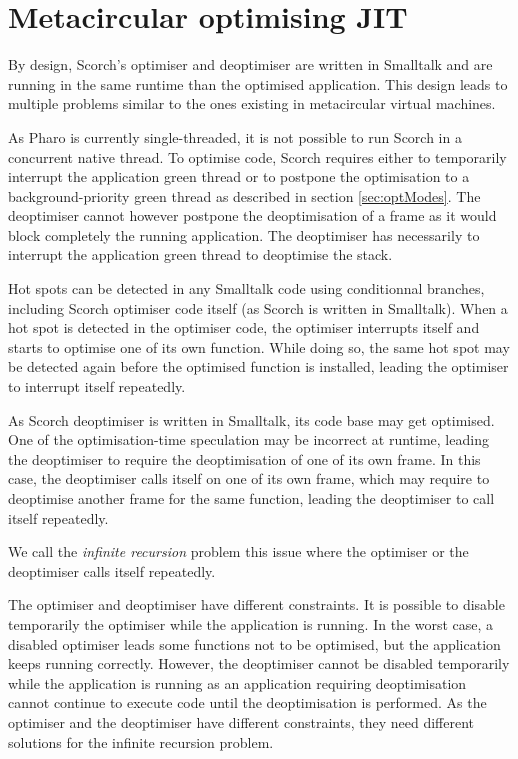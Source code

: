 \documentclass[a4paper,12pt,twoside]{../includes/ThesisStyle}
\begin{document}
\fi

\chapter{Metacircular optimising JIT}
\label{chap:metacircular}
\minitoc

By design, Scorch's optimiser and deoptimiser are written in Smalltalk and are running in the same runtime than the optimised application. This design leads to multiple problems similar to the ones existing in metacircular virtual machines. 

As Pharo is currently single-threaded, it is not possible to run Scorch in a concurrent native thread. To optimise code, Scorch requires either to temporarily interrupt the application green thread or to postpone the optimisation to a background-priority green thread as described in section \ref{sec:optModes}. The deoptimiser cannot however postpone the deoptimisation of a frame as it would block completely the running application. The deoptimiser has necessarily to interrupt the application green thread to deoptimise the stack.

Hot spots can be detected in any Smalltalk code using conditionnal branches, including Scorch optimiser code itself (as Scorch is written in Smalltalk). When a hot spot is detected in the optimiser code, the optimiser interrupts itself and starts to optimise one of its own function. While doing so, the same hot spot may be detected again before the optimised function is installed, leading the optimiser to interrupt itself repeatedly. 

As Scorch deoptimiser is written in Smalltalk, its code base may get optimised. One of the optimisation-time speculation may be incorrect at runtime, leading the deoptimiser to require the deoptimisation of one of its own frame. In this case, the deoptimiser calls itself on one of its own frame, which may require to deoptimise another frame for the same function, leading the deoptimiser to call itself repeatedly. 

We call the \emph{infinite recursion} problem this issue where the optimiser or the deoptimiser calls itself repeatedly.

The optimiser and deoptimiser have different constraints. It is possible to disable temporarily the optimiser while the application is running. In the worst case, a disabled optimiser leads some functions not to be optimised, but the application keeps running correctly. However, the deoptimiser cannot be disabled temporarily while the application is running as an application requiring deoptimisation cannot continue to execute code until the deoptimisation is performed. As the optimiser and the deoptimiser have different constraints, they need different solutions for the infinite recursion problem.
\end{document}
